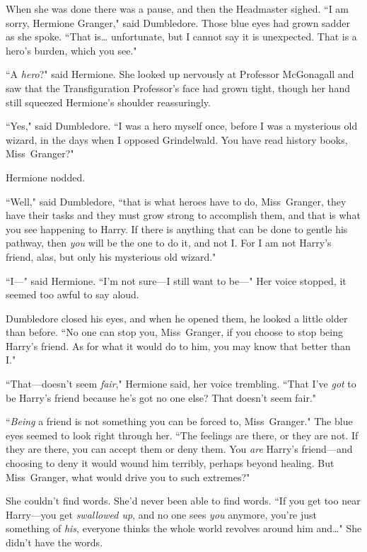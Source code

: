 When she was done there was a pause, and then the Headmaster sighed. ``I am sorry, Hermione Granger," said Dumbledore. Those blue eyes had grown sadder as she spoke. ``That is{\ldots} unfortunate, but I cannot say it is unexpected. That is a hero's burden, which you see."

``A \emph{hero}?" said Hermione. She looked up nervously at Professor McGonagall and saw that the Transfiguration Professor's face had grown tight, though her hand still squeezed Hermione's shoulder reassuringly.

``Yes," said Dumbledore. ``I was a hero myself once, before I was a mysterious old wizard, in the days when I opposed Grindelwald. You have read history books, Miss~Granger?"

Hermione nodded.

``Well," said Dumbledore, ``that is what heroes have to do, Miss~Granger, they have their tasks and they must grow strong to accomplish them, and that is what you see happening to Harry. If there is anything that can be done to gentle his pathway, then \emph{you} will be the one to do it, and not I\@. For I am not Harry's friend, alas, but only his mysterious old wizard."

``I---" said Hermione. ``I'm not sure---I still want to be---" Her voice stopped, it seemed too awful to say aloud.

Dumbledore closed his eyes, and when he opened them, he looked a little older than before. ``No one can stop you, Miss~Granger, if you choose to stop being Harry's friend. As for what it would do to him, you may know that better than I."

``That---doesn't seem \emph{fair}," Hermione said, her voice trembling. ``That I've \emph{got} to be Harry's friend because he's got no one else? That doesn't seem fair."

``\emph{Being} a friend is not something you can be forced to, Miss~Granger." The blue eyes seemed to look right through her. ``The feelings are there, or they are not. If they are there, you can accept them or deny them. You \emph{are} Harry's friend---and choosing to deny it would wound him terribly, perhaps beyond healing. But Miss~Granger, what would drive you to such extremes?"

She couldn't find words. She'd never been able to find words. ``If you get too near Harry---you get \emph{swallowed up}, and no one sees \emph{you} anymore, you're just something of \emph{his}, everyone thinks the whole world revolves around him and{\ldots}" She didn't have the words.

